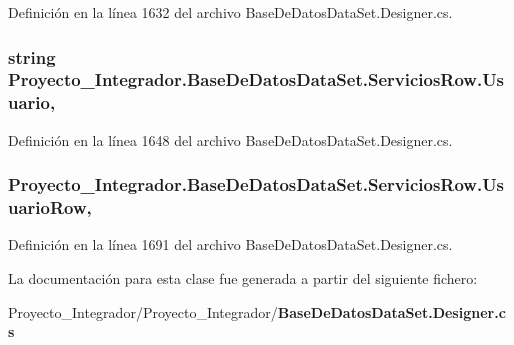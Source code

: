 Definición en la línea 1632 del archivo Base\-De\-Datos\-Data\-Set.\-Designer.\-cs.

\subsubsection[{Usuario}]{\setlength{\rightskip}{0pt plus 5cm}string Proyecto\-\_\-\-Integrador.\-Base\-De\-Datos\-Data\-Set.\-Servicios\-Row.\-Usuario\hspace{0.3cm}{\ttfamily [get]}, {\ttfamily [set]}}\label{class_proyecto___integrador_1_1_base_de_datos_data_set_1_1_servicios_row_af53e8b5a86ea346531b3fd1fef728ec4}


Definición en la línea 1648 del archivo Base\-De\-Datos\-Data\-Set.\-Designer.\-cs.

\subsubsection[{Usuario\-Row}]{ Proyecto\-\_\-\-Integrador.\-Base\-De\-Datos\-Data\-Set.\-Servicios\-Row.\-Usuario\-Row\hspace{0.3cm}{\ttfamily [get]}, {\ttfamily [set]}}\label{class_proyecto___integrador_1_1_base_de_datos_data_set_1_1_servicios_row_a159a749272d5dee8f4fab585865cb0e4}


Definición en la línea 1691 del archivo Base\-De\-Datos\-Data\-Set.\-Designer.\-cs.



La documentación para esta clase fue generada a partir del siguiente fichero\-:\begin{DoxyCompactItemize}
\item 
Proyecto\-\_\-\-Integrador/\-Proyecto\-\_\-\-Integrador/{\bf Base\-De\-Datos\-Data\-Set.\-Designer.\-cs}\end{DoxyCompactItemize}
